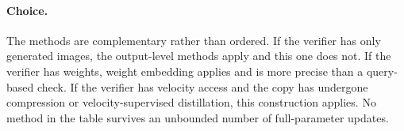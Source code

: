 \documentclass[11pt]{article}
\begin{document}
\paragraph{Choice.}
The methods are complementary rather than ordered. If the verifier has
only generated images, the output-level methods apply and this one does
not. If the verifier has weights, weight embedding applies and is more
precise than a query-based check. If the verifier has velocity access
and the copy has undergone compression or velocity-supervised
distillation, this construction applies. No method in the table
survives an unbounded number of full-parameter updates.
\end{document}
